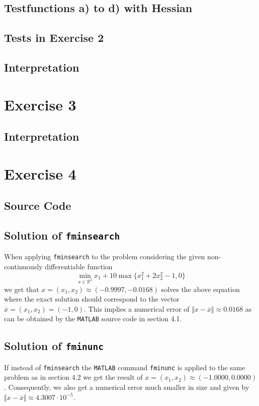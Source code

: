 \documentclass{article}
\begin{document}
	\subsection{Testfunctions a) to d) with Hessian}
	
	
	
	
	
	\subsection{Tests in Exercise 2}
	
	
	\subsection{Interpretation}
	
	\section{Exercise 3}
	\subsection{Interpretation}
	
	
	\section{Exercise 4}
	\subsection{Source Code}
	
	
	\subsection{Solution of \texttt{fminsearch}}
	When applying \texttt{fminsearch} to the problem considering the given non-continuously differentiable function 
	\begin{equation*}
		\min_{x\in\mathbb{R}^2}x_1+10\max\{x_1^2+2x_2^2-1,0\}
	\end{equation*}
	we get that $x=(x_1,x_2)\approx(-0.9997,-0.0168)$ solves the above equation where the exact solution should correspond to the vector $\overline{x}=(x_1,x_2)=(-1,0)$. This implies a numerical error of $\Vert x - \overline{x}\Vert \approx 0.0168$ as can be obtained by the \texttt{MATLAB} source code in section 4.1.
	\subsection{Solution of \texttt{fminunc}}
	If instead of \texttt{fminsearch} the \texttt{MATLAB} command \texttt{fminunc} is applied to the same problem as in section 4.2 we get the result of $x=(x_1,x_2)\approx(-1.0000,0.0000)$. Consequently, we also get a numerical error much smaller in size and given by $\Vert x - \overline{x}\Vert \approx 4.3007\cdot 10^{-5}$.
\end{document}
